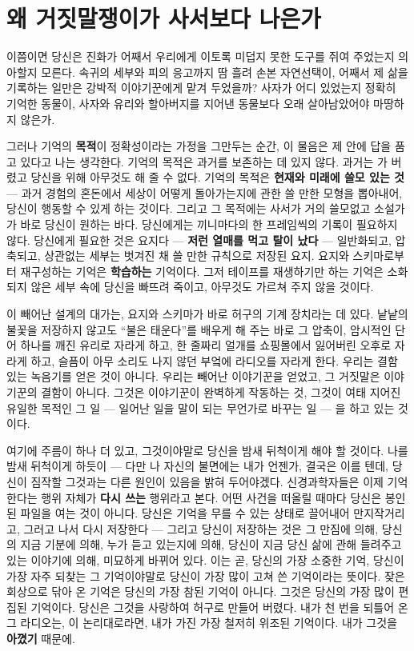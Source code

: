 \section*{왜 거짓말쟁이가 사서보다 나은가}

이쯤이면 당신은 진화가 어째서 우리에게 이토록 미덥지 못한 도구를 쥐여 주었는지 의아할지 모른다. 속귀의 세부와 피의 응고까지 땀 흘려 손본 자연선택이, 어째서 제 삶을 기록하는 일만은 강박적 이야기꾼에게 맡겨 두었을까? 사자가 어디 있었는지 정확히 기억한 동물이, 사자와 유리와 할아버지를 지어낸 동물보다 오래 살아남았어야 마땅하지 않은가.

그러나 기억의 \textbf{목적}이 정확성이라는 가정을 그만두는 순간, 이 물음은 제 안에 답을 품고 있다고 나는 생각한다. 기억의 목적은 과거를 보존하는 데 있지 않다. 과거는 가 버렸고 당신을 위해 아무것도 해 줄 수 없다. 기억의 목적은 \textbf{현재와 미래에 쓸모 있는 것} — 과거 경험의 혼돈에서 세상이 어떻게 돌아가는지에 관한 쓸 만한 모형을 뽑아내어, 당신이 행동할 수 있게 하는 것이다. 그리고 그 목적에는 사서가 거의 쓸모없고 소설가가 바로 당신이 원하는 바다. 당신에게는 끼니마다의 한 프레임씩의 기록이 필요하지 않다. 당신에게 필요한 것은 요지다 — \textbf{저런 열매를 먹고 탈이 났다} — 일반화되고, 압축되고, 상관없는 세부는 벗겨진 채 쓸 만한 규칙으로 저장된 요지. 요지와 스키마로부터 재구성하는 기억은 \textbf{학습하는} 기억이다. 그저 테이프를 재생하기만 하는 기억은 소화되지 않은 세부 속에 당신을 빠뜨려 죽이고, 아무것도 가르쳐 주지 않을 것이다.

이 빼어난 설계의 대가는, 요지와 스키마가 바로 허구의 기계 장치라는 데 있다. 낱낱의 불꽃을 저장하지 않고도 ``불은 태운다''를 배우게 해 주는 바로 그 압축이, 암시적인 단어 하나를 깨진 유리로 자라게 하고, 한 줄짜리 얼개를 쇼핑몰에서 잃어버린 오후로 자라게 하고, 슬픔이 아무 소리도 나지 않던 부엌에 라디오를 자라게 한다. 우리는 결함 있는 녹음기를 얻은 것이 아니다. 우리는 빼어난 이야기꾼을 얻었고, 그 거짓말은 이야기꾼의 결함이 아니다. 그것은 이야기꾼이 완벽하게 작동하는 것, 그것이 여태 지어진 유일한 목적인 그 일 — 일어난 일을 말이 되는 무언가로 바꾸는 일 — 을 하고 있는 것이다.

여기에 주름이 하나 더 있고, 그것이야말로 당신을 밤새 뒤척이게 해야 할 것이다. 나를 밤새 뒤척이게 하듯이 — 다만 나 자신의 불면에는 내가 언젠가, 결국은 이를 텐데, 당신이 짐작할 그것과는 다른 원인이 있음을 밝혀 두어야겠다. 신경과학자들은 이제 기억한다는 행위 자체가 \textbf{다시 쓰는} 행위라고 본다. 어떤 사건을 떠올릴 때마다 당신은 봉인된 파일을 여는 것이 아니다. 당신은 기억을 무를 수 있는 상태로 끌어내어 만지작거리고, 그러고 나서 다시 저장한다 — 그리고 당신이 저장하는 것은 그 만짐에 의해, 당신의 지금 기분에 의해, 누가 듣고 있는지에 의해, 당신이 지금 당신 삶에 관해 들려주고 있는 이야기에 의해, 미묘하게 바뀌어 있다. 이는 곧, 당신의 가장 소중한 기억, 당신이 가장 자주 되찾는 그 기억이야말로 당신이 가장 많이 고쳐 쓴 기억이라는 뜻이다. 잦은 회상으로 닦아 온 기억은 당신의 가장 참된 기억이 아니다. 그것은 당신의 가장 많이 편집된 기억이다. 당신은 그것을 사랑하여 허구로 만들어 버렸다. 내가 천 번을 되틀어 온 그 라디오는, 이 논리대로라면, 내가 가진 가장 철저히 위조된 기억이다. 내가 그것을 \textbf{아꼈기} 때문에.

